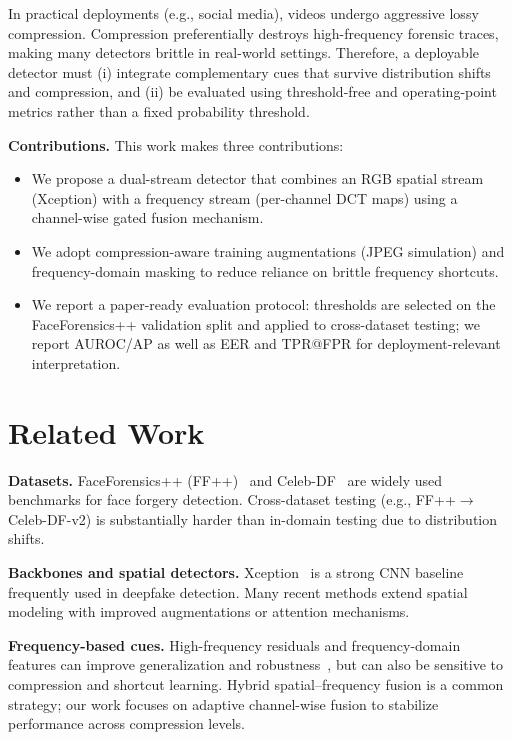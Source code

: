 \documentclass[conference]{IEEEtran}
\begin{document}
In practical deployments (e.g., social media), videos undergo aggressive lossy compression. Compression preferentially destroys high-frequency forensic traces, making many detectors brittle in real-world settings. Therefore, a deployable detector must (i) integrate complementary cues that survive distribution shifts and compression, and (ii) be evaluated using threshold-free and operating-point metrics rather than a fixed probability threshold.

\textbf{Contributions.} This work makes three contributions:
\begin{itemize}
  \item We propose a dual-stream detector that combines an RGB spatial stream (Xception) with a frequency stream (per-channel DCT maps) using a channel-wise gated fusion mechanism.
  \item We adopt compression-aware training augmentations (JPEG simulation) and frequency-domain masking to reduce reliance on brittle frequency shortcuts.
  \item We report a paper-ready evaluation protocol: thresholds are selected on the FaceForensics++ validation split and applied to cross-dataset testing; we report AUROC/AP as well as EER and TPR@FPR for deployment-relevant interpretation.
\end{itemize}

\section{Related Work}
\textbf{Datasets.} FaceForensics++ (FF++)~\cite{rossler2019faceforensics} and Celeb-DF~\cite{li2020celebdf} are widely used benchmarks for face forgery detection. Cross-dataset testing (e.g., FF++$\rightarrow$Celeb-DF-v2) is substantially harder than in-domain testing due to distribution shifts.

\textbf{Backbones and spatial detectors.} Xception~\cite{chollet2017xception} is a strong CNN baseline frequently used in deepfake detection. Many recent methods extend spatial modeling with improved augmentations or attention mechanisms.

\textbf{Frequency-based cues.} High-frequency residuals and frequency-domain features can improve generalization and robustness~\cite{luo2021hf}, but can also be sensitive to compression and shortcut learning. Hybrid spatial--frequency fusion is a common strategy; our work focuses on adaptive channel-wise fusion to stabilize performance across compression levels.
\end{document}
